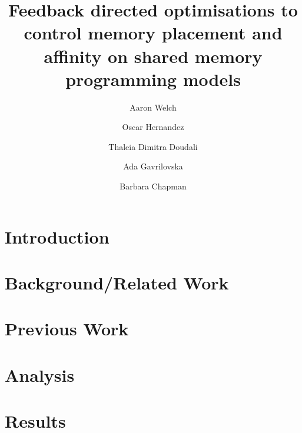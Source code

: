 \documentclass[runningheads]{llncs}
\begin{document}
\title{Feedback directed optimisations to control memory placement and affinity on shared memory programming models}
\author[1, 2]{Aaron Welch}
\author[1]{Oscar Hernandez}
\author[3]{Thaleia Dimitra Doudali}
\author[3]{Ada Gavrilovska}
\author[2]{Barbara Chapman}

\maketitle
\begin{abstract}

\end{abstract}
\section{Introduction}
\label{sec:intro}

\section{Background/Related Work}
\label{sec:background}

\section{Previous Work}
\label{sec:prevwork}

\section{Analysis}
\label{sec:analysis}

\section{Results}
\label{sec:results}

%
%


\end{document}
